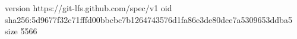 version https://git-lfs.github.com/spec/v1
oid sha256:5d9677f32c71fffd00bbcbc7b1264743576d1fa86e3de80dce7a5309653ddba5
size 5566
